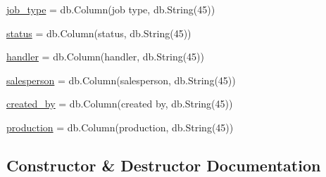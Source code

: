 \begin{DoxyCompactItemize}
\hyperlink{class_web_content_1_1classes_1_1_shows_ae5f65ed709a0218f1298610e91500719}{job\+\_\+type} = db.\+Column(\textquotesingle{}job type\textquotesingle{}, db.\+String(45))
\item 
\hyperlink{class_web_content_1_1classes_1_1_shows_ae116171a1ecb47ad43e5631115fe9f43}{status} = db.\+Column(\textquotesingle{}status\textquotesingle{}, db.\+String(45))
\item 
\hyperlink{class_web_content_1_1classes_1_1_shows_a23219663a5b011841e8054fc6ca88e0f}{handler} = db.\+Column(\textquotesingle{}handler\textquotesingle{}, db.\+String(45))
\item 
\hyperlink{class_web_content_1_1classes_1_1_shows_a59168ff70138cf3bafb49d58bc7e4cbe}{salesperson} = db.\+Column(\textquotesingle{}salesperson\textquotesingle{}, db.\+String(45))
\item 
\hyperlink{class_web_content_1_1classes_1_1_shows_a1c11f5ef467e4230b4672c40cd7268fe}{created\+\_\+by} = db.\+Column(\textquotesingle{}created by\textquotesingle{}, db.\+String(45))
\item 
\hyperlink{class_web_content_1_1classes_1_1_shows_adc73b524e8f3e05611ab8f4a3b0543c1}{production} = db.\+Column(\textquotesingle{}production\textquotesingle{}, db.\+String(45))
\end{DoxyCompactItemize}


\subsection{Constructor \& Destructor Documentation}
\mbox{\label{class_web_content_1_1classes_1_1_shows_a0b3f8378e782b5f62fceb65380881216}} 
